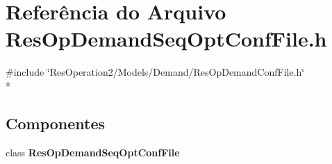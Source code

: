 \section{Referência do Arquivo Res\+Op\+Demand\+Seq\+Opt\+Conf\+File.\+h}
\label{_res_op_demand_seq_opt_conf_file_8h}
{\ttfamily \#include \char`\"{}Res\+Operation2/\+Models/\+Demand/\+Res\+Op\+Demand\+Conf\+File.\+h\char`\"{}}\\*
\subsection*{Componentes}
\begin{DoxyCompactItemize}
\item 
class {\bf Res\+Op\+Demand\+Seq\+Opt\+Conf\+File}
\end{DoxyCompactItemize}
